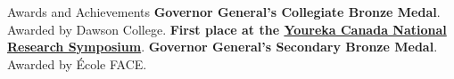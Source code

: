 \begin{rubric}{Awards and Achievements}
\entry*[2025] \textbf{Governor General's Collegiate Bronze Medal}. Awarded by Dawson College.
%
\entry*[2024] \textbf{First place at the \href{https://yourekacanada.org/youreka-journal}{Youreka Canada National Research Symposium\faExternalLinkSquare*}}.
%
\entry*[2023] \textbf{Governor General's Secondary Bronze Medal}. Awarded by École FACE.
%
\end{rubric}